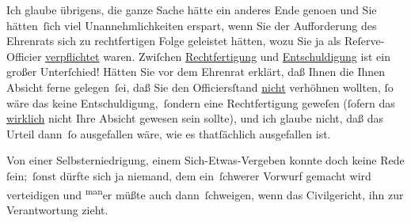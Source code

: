 \pstart
           Ich glaube übrigens, die ganze Sache hätte ein anderes Ende geno{\geminationm}en und Sie hätten ſich viel Unannehmlichkeiten erspart,
               wenn Sie der Aufforderung des Ehrenrats sich zu
               rechtfertigen Folge {\pb}geleistet hätten, wozu Sie ja als Reſerve-Officier \uline{verpflichtet} waren. Zwiſchen \uline{Rechtfertigung} und \uline{Entschuldigung} ist
               ein großer Unterſchied! Hätten Sie vor dem Ehrenrat erklärt, daß Ihnen die Ihnen \label{K_L04321-7v}\label{K_L04321-7} Absicht ferne gelegen ſei, daß
               Sie  den Officiersſtand \uline{nicht} verhöhnen wollten,{ }ſo wäre das keine Entschuldigung, ſondern eine
               Rechtfertigung geweſen (ſofern das \uline{wirklich} nicht
               Ihre Absicht gewesen sein sollte), und ich glaube nicht, daß das Urteil dann ſo
               ausgefallen wäre, wie es thatſächlich ausgefallen ist.\pend
           
\pstart
           Von einer Selbsterniedrigung, einem Sich-Etwas-Vergeben konnte doch keine Rede{ }ſein; ſonst dürfte sich ja niemand, dem ein ſchwerer Vorwurf gemacht wird verteidigen
               und \substVorne{}\textsuperscript{man}\substDazwischen{}er\substHinten{} müßte auch dann ſchweigen, wenn das Civil{\pb}gericht, ihn zur
               Verantwortung zieht.\pend
           
